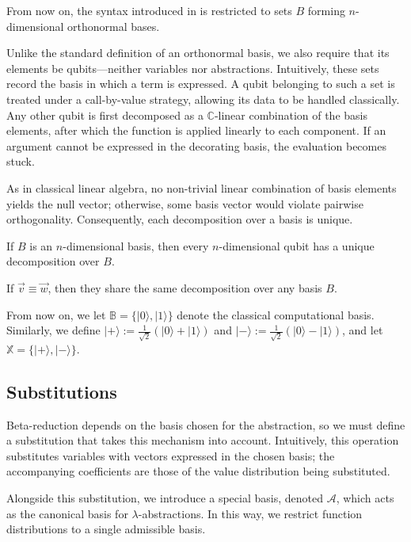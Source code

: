 \documentclass[runningheads,orivec,envcountsame,envcountsect]{llncs}
\newcommand\ket[1]{\ensuremath{|#1\rangle}}
\newcommand\AbsBasis{\ensuremath{\mathcal{A}}}
\def\C{\mathbb{C}}            %
\newcommand\B{\mathbb B}
\newcommand\XB{\mathbb X}
\begin{document}
From now on, the syntax introduced in 
is restricted to sets $B$ forming $n$-dimensional
orthonormal bases.


Unlike the standard definition of an orthonormal basis, we also require that
its elements be qubits—neither variables nor abstractions. Intuitively, these
sets record the basis in which a term is expressed. A qubit belonging to such a
set is treated under a call-by-value strategy, allowing its data to be handled
classically. Any other qubit is first decomposed as a $\C$-linear combination
of the basis elements, after which the function is applied linearly to each
component. If an argument cannot be expressed in the decorating basis, the
evaluation becomes stuck.

As in classical linear algebra, no non-trivial linear combination of basis
elements yields the null vector; otherwise, some basis vector would violate
pairwise orthogonality. Consequently, each decomposition over a basis is
unique.

\begin{theorem}\label{thm:UniqueDecomposition}
  If $B$ is an $n$-dimensional basis, then every $n$-dimensional qubit has a
  unique decomposition over $B$.
\end{theorem}

\begin{corollary}\label{cor:EquivalentDecomposition}
  If $\vec{v} \equiv \vec{w}$, then they share the same decomposition over any
  basis $B$.
\end{corollary}

From now on, we let $\B=\{\ket{0},\ket{1}\}$ denote the classical computational
basis. Similarly, we define
$\ket{+}:=\frac 1{\sqrt{2}}(\ket{0}+\ket{1})$ and
$\ket{-}:=\frac 1{\sqrt{2}}(\ket{0}-\ket{1})$, and let
$\XB=\{\ket{+},\ket{-}\}$.

\subsection{Substitutions}
Beta-reduction depends on the basis chosen for the abstraction, so we must
define a substitution that takes this mechanism into account. Intuitively, this
operation substitutes variables with vectors expressed in the chosen basis; the
accompanying coefficients are those of the value distribution being
substituted.

Alongside this substitution, we introduce a special basis, denoted
$\AbsBasis$, which acts as the canonical basis for $\lambda$-abstractions. In
this way, we restrict function distributions to a single admissible basis.
\end{document}
